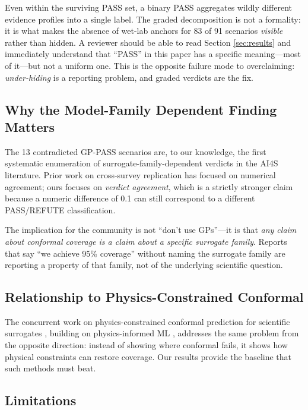 \documentclass[journal]{IEEEtran}
\begin{document}
Even within the surviving PASS set, a binary PASS aggregates wildly different
evidence profiles into a single label. The graded decomposition is not a
formality: it is what makes the absence of wet-lab anchors for 83 of 91
scenarios \textit{visible} rather than hidden. A reviewer should be able to
read Section \ref{sec:results} and immediately understand that ``PASS'' in
this paper has a specific meaning---most of it---but not a uniform one. This
is the opposite failure mode to overclaiming: \textit{under-hiding} is a
reporting problem, and graded verdicts are the fix.

\subsection{Why the Model-Family Dependent Finding Matters}

The 13 contradicted GP-PASS scenarios are, to our knowledge, the first
systematic enumeration of surrogate-family-dependent verdicts in the AI4S
literature. Prior work on cross-survey replication has focused on numerical
agreement; ours focuses on \textit{verdict agreement}, which is a strictly
stronger claim because a numeric difference of 0.1 can still correspond to a
different PASS/REFUTE classification.

The implication for the community is not ``don't use GPs''---it is that
\textit{any claim about conformal coverage is a claim about a specific
surrogate family}. Reports that say ``we achieve 95\% coverage'' without
naming the surrogate family are reporting a property of that family, not of
the underlying scientific question.

\subsection{Relationship to Physics-Constrained Conformal}

The concurrent work on physics-constrained conformal prediction for scientific
surrogates \cite{physconf2026}, building on physics-informed ML
\cite{karniadakis2021physics}, addresses the same problem from the opposite
direction: instead of showing where conformal fails, it shows how physical
constraints can restore coverage. Our results provide the baseline that such
methods must beat.

\subsection{Limitations}
\end{document}
